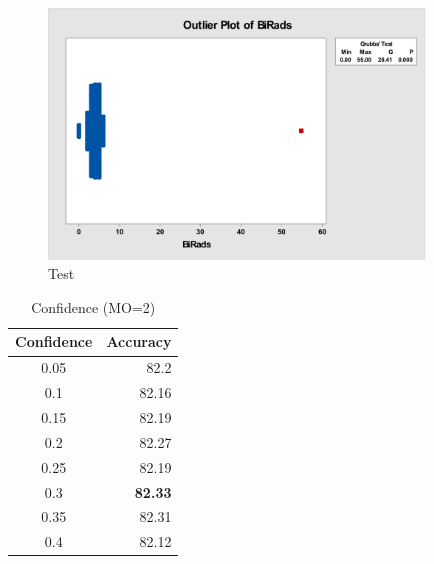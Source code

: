 \documentclass[12pt]{article}
\begin{document}
  \begin{figure}[ht]
    \centering
    \includegraphics[width=10cm]{birads-outlier-plot}
    \caption{Test}
    \label{fig:Test}
  \end{figure}

\begin{table}[htbp]
  \centering
  \caption{Confidence (MO=2)}
    \begin{tabular}{c|r}
    \toprule
    \multicolumn{1}{l|}{Confidence} & \multicolumn{1}{l}{Accuracy} \\
    \midrule
    0.05  & 82.2 \\
    0.1   & 82.16 \\
    0.15  & 82.19 \\
    0.2   & 82.27 \\
    0.25  & 82.19 \\
    0.3   & \textbf{82.33} \\
    0.35  & 82.31 \\
    0.4   & 82.12 \\
    \bottomrule
    \end{tabular}%
  \label{tab:addlabel}%
\end{table}%
\end{document}
